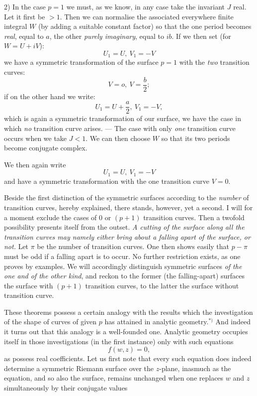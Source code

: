 \documentclass{article}
\begin{document}
2) In the case $p = 1$ we must, as we know, in any case take the invariant $J$ real. Let it first be $> 1$. Then we can normalise the associated everywhere finite integral $W$ (by adding a suitable constant factor) so that the one period becomes \emph{real}, equal to $a$, the other \emph{purely imaginary}, equal to $ib$. If we then set (for $W = U + iV$):
\[ U_{1} = U,\ V_{1} = - V \]
we have a symmetric transformation of the surface $p = 1$ with the \emph{two} transition curves:
\[ V = o,\ V = \frac{b}{2}; \]
if on the other hand we write:
\[ U_{1} = U + \frac{a}{2},\ V_{1} = - V, \]
which is again a symmetric transformation of our surface, we have the case in which \emph{no} transition curve arises. --- The case with only \emph{one} transition curve occurs when we take $J < 1$. We can then choose $W$ so that its two periods become conjugate complex.

We then again write
\[ U_{1} = U,\ V_{1} = - V \]
and have a symmetric transformation with the one transition curve $V = 0$.

Beside the first distinction of the symmetric surfaces according to the \emph{number} of transition curves, hereby explained, there stands, however, yet a second. I will for a moment exclude the cases of $0$ or $(p + 1)$ transition curves. Then a twofold possibility presents itself from the outset. \emph{A cutting of the surface along all the transition curves may namely either bring about a falling apart of the surface, or not.} Let $\pi$ be the number of transition curves. One then shows easily that $p - \pi$ must be odd if a falling apart is to occur. No further restriction exists, as one proves by examples. We will accordingly distinguish symmetric surfaces \emph{of the one and of the other kind}, and reckon to the former (the falling-apart) surfaces the surface with $(p + 1)$ transition curves, to the latter the surface without transition curve.

These theorems possess a certain analogy with the results which the investigation of the shape of curves of given $p$ has attained in analytic geometry.${}^{*)}$ And indeed it turns out that this analogy is a well-founded one. Analytic geometry occupies itself in those investigations (in the first instance) only with such equations
\[ f(w, z) = 0, \]
as possess real coefficients. Let us first note that every such equation does indeed determine a symmetric Riemann surface over the $z$-plane, inasmuch as the equation, and so also the surface, remains unchanged when one replaces $w$ and $z$ simultaneously by their conjugate values
\end{document}
